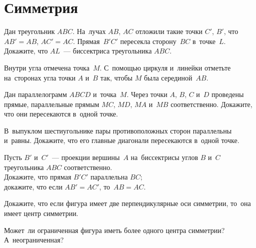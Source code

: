 
\section*{Симметрия}


\begin{problems}


\item
Дан треугольник $ABC$.
На~лучах $AB$, $AC$ отложили такие точки $C'$, $B'$, что
$AB' = AB$, $AC' = AC$.
Прямая~$B'C'$ пересекла сторону~$BC$ в~точке~$L$.
Докажите, что $AL$~--- биссектриса треугольника $ABC$.

\item
Внутри угла отмечена точка~$M$.
С~помощью циркуля и~линейки отметьте на~сторонах угла точки $A$ и~$B$ так,
чтобы $M$ была серединой~$AB$.

\item
Дан параллелограмм $ABCD$ и~точка~$M$.
Через точки $A$, $B$, $C$ и~$D$ проведены прямые, параллельные прямым
$MC$, $MD$, $MA$ и~$MB$ соответственно.
Докажите, что они пересекаются в~одной точке.


\item
В~выпуклом шестиугольнике пары противоположных сторон параллельны и~равны.
Докажите, что его главные диагонали пересекаются в~одной точке.

\item
Пусть $B'$ и~$C'$~--- проекции вершины~$A$ на~биссектрисы углов $B$ и~$C$
треугольника $ABC$ соответственно.
\\
\subproblem
Докажите, что прямая $B'C'$ параллельна $BC$;
\\
\subproblem
докажите, что если $AB' = AC'$, то~$AB = AC$.

\item
Докажите, что если фигура имеет две перпендикулярные оси симметрии, то~она
имеет центр симметрии.

\item
Может~ли ограниченная фигура иметь более одного центра симметрии?
А~неограниченная?


\end{problems}
